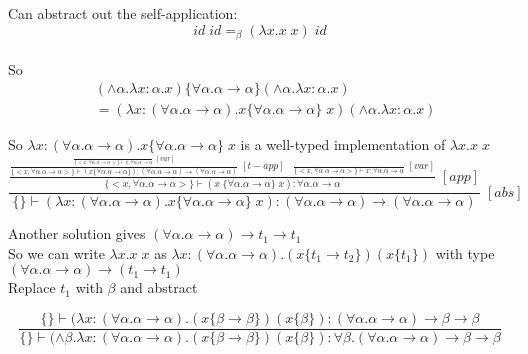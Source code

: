 \documentclass[11pt]{article}
\begin{document}
Can abstract out the self-application:
$$id\;id =_\beta (\lambda x.x\;x)\;id$$ \\

So 
\begin{align*}
&(\land \alpha.\lambda x:\alpha.x)\{\forall \alpha.\alpha \rightarrow \alpha\} (\land \alpha.\lambda x:\alpha.x) \\
&= (\lambda x:(\forall \alpha.\alpha \rightarrow \alpha).x\{\forall \alpha.\alpha \rightarrow \alpha\}\;x)(\land \alpha.\lambda x:\alpha.x) 
\end{align*}

So $\lambda x:(\forall \alpha.\alpha \rightarrow \alpha).x\{\forall \alpha.\alpha \rightarrow \alpha\}\;x$ is a well-typed implementation of $\lambda x.x\;x$ \\

$$\frac{\frac{\frac{\frac{}{\{<x,\forall \alpha.\alpha \rightarrow \alpha>\} \vdash x:\forall \alpha.\alpha \rightarrow \alpha}\;[var]}{\{<x,\forall \alpha.\alpha \rightarrow \alpha>\} \vdash (x \{\forall \alpha.\alpha \rightarrow \alpha\}): (\forall \alpha.\alpha \rightarrow \alpha) \rightarrow (\forall \alpha.\alpha \rightarrow \alpha)}\;[t-app] \;\;\; \frac{}{\{<x,\forall \alpha.\alpha \rightarrow \alpha>\} \vdash x:\forall \alpha.\alpha \rightarrow \alpha}\;[var]}{\{<x,\forall \alpha.\alpha \rightarrow \alpha>\} \vdash (x\;\{\forall \alpha.\alpha \rightarrow \alpha\}\;x):\forall \alpha.\alpha \rightarrow \alpha}\;[app]}{\{\} \vdash (\lambda x:(\forall \alpha.\alpha \rightarrow \alpha).x\{\forall \alpha.\alpha \rightarrow \alpha\}\;x): (\forall \alpha.\alpha \rightarrow \alpha) \rightarrow (\forall \alpha.\alpha \rightarrow \alpha)}\;[abs]$$

Another solution gives $(\forall \alpha. \alpha \rightarrow \alpha) \rightarrow t_1 \rightarrow t_1$ \\

So we can write $\lambda x.x\;x$ as $\lambda x:(\forall \alpha. \alpha \rightarrow \alpha).(x\{t_1 \rightarrow t_2\})(x\{t_1\})$ with type $(\forall \alpha. \alpha \rightarrow \alpha) \rightarrow (t_1 \rightarrow t_1)$ \\

Replace $t_1$ with $\beta$ and abstract 

$$\frac{\{\} \vdash (\lambda x:(\forall \alpha. \alpha \rightarrow \alpha).(x\{\beta \rightarrow \beta\})(x\{\beta\}): (\forall \alpha. \alpha \rightarrow \alpha) \rightarrow \beta \rightarrow \beta}{\{\} \vdash (\land \beta.\lambda x:(\forall \alpha. \alpha \rightarrow \alpha).(x\{\beta \rightarrow \beta\})(x\{\beta\}): \forall \beta.(\forall \alpha. \alpha \rightarrow \alpha) \rightarrow \beta 
\rightarrow \beta}$$
\end{document}
